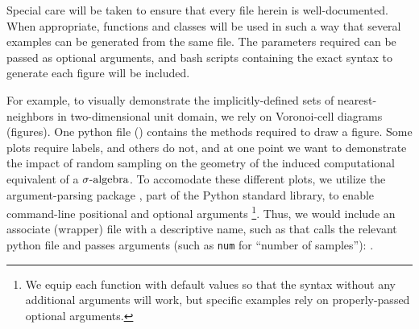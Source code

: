 Special care will be taken to ensure that every file herein is well-documented. When appropriate, functions and classes will be used in such a way that several examples can be generated from the same file.
The parameters required can be passed as optional arguments, and bash scripts containing the exact syntax to generate each figure will be included.

For example, to visually demonstrate the implicitly-defined sets of nearest-neighbors in two-dimensional unit domain, we rely on Voronoi-cell diagrams (figures).
One python file () contains the methods required to draw a figure.
Some plots require labels, and others do not, and at one point we want to demonstrate the impact of random sampling on the geometry of the induced computational equivalent of a $\sigma\text{-algebra}$.
To accomodate these different plots, we utilize the argument-parsing package , part of the Python standard library, to enable command-line positional and optional arguments \footnote{We equip each function with default values so that the syntax  without any additional arguments will work, but specific examples rely on properly-passed optional arguments.}.
Thus, we would include an associate (wrapper) file with a descriptive name, such as  that calls the relevant python file and passes arguments (such as {\tt num} for ``number of samples''):
.
